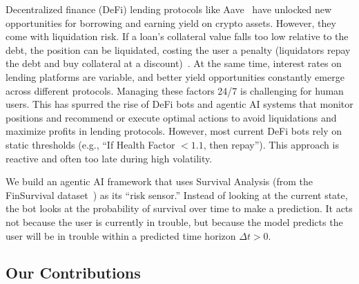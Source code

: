 \documentclass[manuscript,screen,review]{acmart}
\begin{document}
Decentralized finance (DeFi) lending protocols like Aave~\cite{aave_v3_technical_paper} have unlocked new opportunities for borrowing and earning yield on crypto assets. However, they come with liquidation risk. If a loan’s collateral value falls too low relative to the debt, the position can be liquidated, costing the user a penalty (liquidators repay the debt and buy collateral at a discount)~\cite{aave_liquidations}. At the same time, interest rates on lending platforms are variable, and better yield opportunities constantly emerge across different protocols. Managing these factors 24/7 is challenging for human users. This has spurred the rise of DeFi bots and agentic AI systems that monitor positions and recommend or execute optimal actions to avoid liquidations and maximize profits in lending protocols.
However, most current DeFi bots rely on static thresholds (e.g., ``If Health Factor $< 1.1$, then repay''). This approach is reactive and often too late during high volatility.

We build an agentic AI framework that uses Survival Analysis (from the FinSurvival dataset~\cite{green2025finsurvival}) as its ``risk sensor.'' Instead of looking at the current state, the bot looks at the probability of survival over time to make a prediction. It acts not because the user is currently in trouble, but because the model predicts the user will be in trouble within a predicted time horizon $\Delta t > 0$.

\subsection{Our Contributions}
\end{document}

